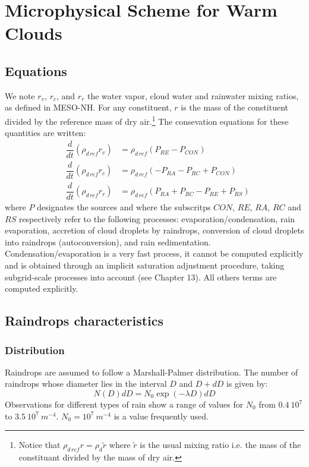 
\chapter{Microphysical Scheme for Warm Clouds}
\minitoc


\section{Equations}
We note $r_v$, $r_c$, and $r_r$ the water vapor, cloud water and rainwater
mixing ratios, as defined in MESO-NH. For any constituent,
$r$ is the mass of the
constituent divided by the reference mass of dry air.\footnote{Notice that
$\rho_{d\, ref}r = \rho_d \tilde r$ where  $\tilde r$ is the usual mixing ratio
i.e. the mass of the constituant divided by the mass of dry air.}
The consevation equations for these quantities are written:
\begin{eqnarray}
 &\dfrac{d}{dt}(  \rho_{d\,ref} r_v)&= \rho_{d\,ref} (P_{RE}-  P_{CON})\\
 &\dfrac{d}{dt}(  \rho_{d\,ref} r_c)&= \rho_{d\,ref}(- P_{RA} -  P_{RC}+  P_{CON})\\
 &\dfrac{d}{dt}(  \rho_{d\,ref} r_r)&= \rho_{d\,ref} (P_{RA} +  P_{RC} -  P_{RE}
+  P_{RS})
\end{eqnarray}
where $P$ designates the sources and where the subscritps
 $CON$, $RE$, $RA$, $RC$ and $RS$  respectively refer to the following processes:
evaporation/condensation, rain evaporation, accretion of cloud droplets by
raindrops, conversion of cloud droplets into raindrops (autoconversion),
and rain sedimentation.
Condensation/evaporation is a very fast process, it cannot be computed
explicitly and is obtained through an implicit saturation adjustment
procedure, taking subgrid-scale processes into account (see Chapter 13).
All others terms are computed explicitly.


\section{Raindrops characteristics}
\subsection{Distribution}
Raindrops are assumed to follow a Marshall-Palmer distribution. The number of
raindrops whose diameter lies in the interval
$D$ and $D+dD$ is given by:
\begin{equation}
N(D)dD=N_0 \exp (-\lambda D) dD
\end{equation}
Observations for different types of rain show a range of values for
$N_0$ from
$0.4\ 10^7$ to $3.5\ 10^7\ m^{-4}$. $N_0= 10^7\ m^{-4}$
is a value frequently used.


